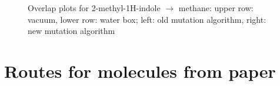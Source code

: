 \begin{figure}[h]
	\hfil
	
	\caption{Overlap plots for 2-methyl-1H-indole $\mathrm{\rightarrow}$ methane: upper row: vacuum, lower row: water box; left: old mutation algorithm, right: new mutation algorithm}
	\label{fig:methylindole_overlaps}
\end{figure}


\section{Routes for molecules from {\trafo} paper}


